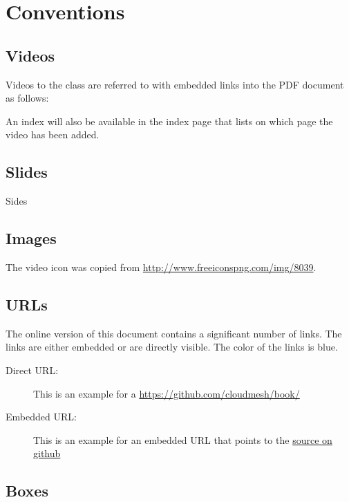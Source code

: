 \section{Conventions}

\subsection{Videos}

Videos to the class are referred to with embedded links into the PDF
document as follows: 


An index will also be available in the index page
that lists on which page the video has been added.

\subsection{Slides}

Sides

\subsection{Images}

The video icon was copied from \url{http://www.freeiconspng.com/img/8039}.

\subsection{URLs}

The online version of this document contains a significant number of
links. The links are either embedded or are directly visible. The
color of the links is blue.

\begin{description}
\item[Direct URL:] This is an example for a
  \url{https://github.com/cloudmesh/book/}
\item[Embedded URL:] This is an example for an embedded URL that
  points to the \href{https://github.com/cloudmesh/book/}{source on github}
\end{description}

\subsection{Boxes}

